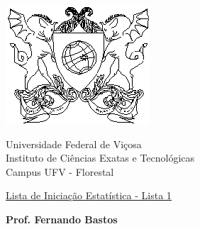 \documentclass{report}
\begin{document}



\vspace*{-2cm}

\begin{center}
\begin{minipage}[s]{4cm}
\hspace{-1.3cm}\includegraphics[scale=1.0]{Figuras/brasaoufv.eps}
\end{minipage}
\begin{minipage}[s]{13cm}
{\begin{center} {\sc \Large Universidade Federal de Vi\c{c}osa}\\
{\sc \large Instituto de Ci\^encias Exatas e Tecnológicas}\\
{\sc \large Campus UFV - Florestal}\\
\end{center}}
\end{minipage}\begin{minipage}[s]{2 cm}
\end{minipage}
\end{center}

\vspace{-0.3cm}



\medskip

\begin{center}

\underline{\underline{{\large{\sc Lista de Iniciação Estatística - Lista 1}}}}

\bigskip

{\large {\bf Prof. Fernando Bastos}}
%
\end{center}
\end{document}
